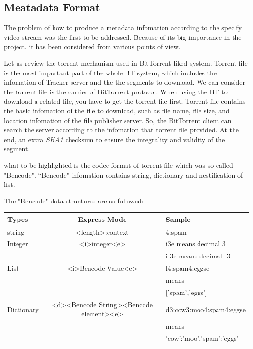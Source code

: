 \subsection{Meatadata Format}
{
The problem of how to produce a metadata infomation according to the specify video stream was the first to be addressed.
Because of its big importance in the project. it has been considered from various points of view.

Let us review the torrent mechanism used in BitTorrent liked system. 
Torrent file is the most important part of the whole BT system, which includes the infomation of Tracker server and the the segments to download. 
We can consider the torrent file is the carrier of BitTorrent protocol. When using the BT to download a related file, you have to get the torrent file first.
Torrent file contains the basic infomation of the file to download, such as file name, file size, and location infomation of the file publisher server.
So, the BitTorrent client can search the server according to the infomation that torrent file provided.
At the end, an extra \emph{SHA1} checksum to ensure the integrality and validity of the segment.

what to be highlighted is the codec format of torrent file which was so-called "Bencode".
“Bencode" infomation contains string, dictionary and nestification of list.

The "Bencode" data structures are as followed:

\begin{tabular}{|l|c|l|}\toprule
Types      &  Express Mode                           & Sample  \\ \midrule
string     &  \textless length\textgreater :context  & 4:spam \\ \hline
Integer    &  \textless i\textgreater integer\textless e\textgreater          & i3e means decimal 3 \\
           &                                         & i-3e means decimal -3 \\ \hline
List       &  \textless i\textgreater Bencode Value\textless e\textgreater & l4:spam4:eggse \\
           &                                          &        means \\
          &                                            & ['spam','eggs'] \\ \hline  
Dictionary & \textless d\textgreater \textless Bencode String\textgreater \textless Bencode element\textgreater \textless e\textgreater &d3:cow3:moo4:spam4:eggse \\
        &                                       &means \\
           &                                         &   {'cow':'moo','spam':'eggs'}\\
\bottomrule
\end{tabular}

}
